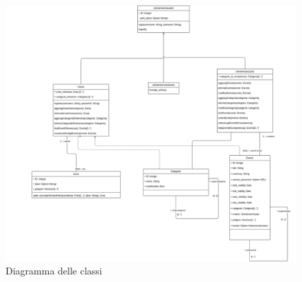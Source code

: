 \clearpage

\begin{figure}[htbp]
    \centering
    \includegraphics[width=1\textwidth]{Images/ClassDiagram.png}
    \caption{Diagramma delle classi}
    \label{fig:class-diagram}
\end{figure}
